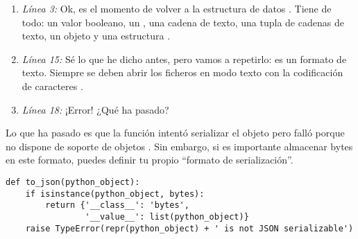 \begin{enumerate}

\item \emph{Línea 3:} Ok, es el momento de volver a la estructura de datos . Tiene de todo: un valor booleano, un , una cadena de texto, una tupla de cadenas de texto, un objeto  y una estructura .

\item \emph{Línea 15:} Sé lo que he dicho antes, pero vamos a repetirlo:  es un formato de texto. Siempre se deben abrir los ficheros  en modo texto con la codificación de caracteres .

\item \emph{Línea 18:} ¡Error! ¿Qué ha pasado?

\end{enumerate}

Lo que ha pasado es que la función  intentó serializar el objeto  pero falló porque  no dispone de soporte de objetos . Sin embargo, si es importante almacenar bytes en este formato, puedes definir tu propio ``formato de serialización''.

\noindent\begin{minipage}{\textwidth}
\begin{lstlisting}[mathescape=True]
def to_json(python_object):            
    if isinstance(python_object, bytes):
        return {'__class__': 'bytes',
                '__value__': list(python_object)}
    raise TypeError(repr(python_object) + ' is not JSON serializable')
\end{lstlisting}
\end{minipage}

